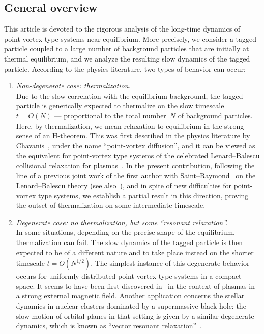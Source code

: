 \documentclass[a4paper,11pt,reqno,noindent]{amsart}
\theoremstyle{plain}
\numberwithin{equation}{section}
\newcommand{\3}{|\!|\!|}
\begin{document}
\subsection{General overview}
This article is devoted to the rigorous analysis of the long-time dynamics of {point-vortex type systems} near equilibrium. More precisely, we consider a tagged particle coupled to a large number of background particles that are initially at thermal equilibrium, and we analyze the resulting slow dynamics of the tagged particle.
According to the physics literature, two types of behavior can occur:
\begin{enumerate}[---]
\item {\it Non-degenerate case: {thermalization.}}\\
Due to the slow correlation with the equilibrium background, the tagged particle is generically expected to thermalize on the slow timescale $t=O(N)$ --- proportional to the total number~$N$ of background particles. {Here, by thermalization, we mean relaxation to equilibrium in the strong sense of an H-theorem.} This was first described in the physics literature by Chavanis~\cite{Chavanis-98,Chavanis-01,Chavanis-12a,Chavanis-12b,Chavanis-23}, under the name ``point-vortex diffusion'', and it can be viewed as the equivalent for point-vortex type systems of the celebrated Lenard--Balescu collisional relaxation for plasmas~\cite{Balescu-60,Lenard-60,Guernsey-62,TGM-64}.
In the present contribution, following the line of a previous joint work of the first author with Saint--Raymond~\cite{DSR-21} on the Lenard--Balescu theory (see also~\cite{D-21a}), and in spite of new difficulties for point-vortex type systems, we establish a partial result in this direction, proving the outset of thermalization on some intermediate timescale.
\smallskip\item {\it Degenerate case: {no thermalization, but some ``resonant relaxation''.}}\\
In some situations, depending on the precise shape of the equilibrium, thermalization can fail. The slow dynamics of the tagged particle is then expected to be of a different nature and to take place instead on the shorter timescale $t=O(N^{1/2})$.
The simplest instance of this degenerate behavior occurs for uniformly distributed point-vortex type systems in a compact space. It seems to have been first discovered in~\cite{Taylor-McNamara-71} in the context of plasmas in a strong external magnetic field. Another application concerns the stellar dynamics in nuclear clusters dominated by a supermassive black hole: the slow motion of orbital planes in that setting is given by a similar degenerate dynamics, which is known as ``vector resonant relaxation''~\cite{Rauch-Tremaine-96,Kocsis-Tremaine-15,Fouvry-BarOr-Chavanis-19,Magnan-Fouvry-Pichon-Chavanis-22}.

\end{enumerate}
\end{document}
